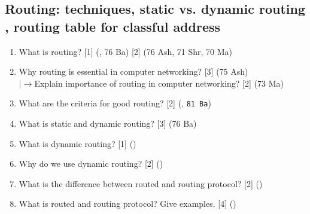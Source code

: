 \documentclass[12pt]{article}
\newcommand{\lb}{\\$\left|\rightarrow\right.$}
\begin{document}
	\subsection{Routing: techniques, static vs. dynamic routing , routing table for classful address}
		\begin{enumerate}[noitemsep, topsep=0pt]
			\item What is routing? \hfill [1] (, 76 Ba) [2] (76 Ash, 71 Shr, 70 Ma)

			\item Why routing is essential in computer networking? \hfill [3] (75 Ash)
			\lb Explain importance of routing in computer networking? \hfill [2] (73 Ma)
			
			\item What are the criteria for good routing? \hfill [2] (, \texttt{81 Ba})

			\item What is static and dynamic routing? \hfill [3] (76 Ba)
			
			\item What is dynamic routing? \hfill [1] ()
			
			\item Why do we use dynamic routing? \hfill [2] ()

			\item What is the difference between routed and routing protocol? \hfill [2] ()
			
			\item What is routed and routing protocol? Give examples. \hfill [4] ()
		\end{enumerate}
\end{document}
